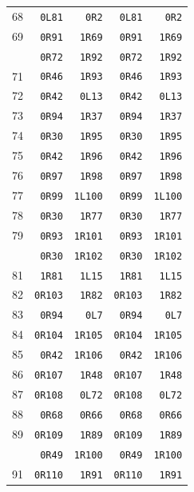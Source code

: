 \begin{longtable}{@{}r r r r r@{}}
68 & \texttt{0L81} & \texttt{0R2} & \texttt{0L81} & \texttt{0R2}\\
69 & \texttt{0R91} & \texttt{1R69} & \texttt{0R91} & \texttt{1R69}\\
\addlinespace[3pt]
70 & \texttt{0R72} & \texttt{1R92} & \texttt{0R72} & \texttt{1R92}\\
71 & \texttt{0R46} & \texttt{1R93} & \texttt{0R46} & \texttt{1R93}\\
72 & \texttt{0R42} & \texttt{0L13} & \texttt{0R42} & \texttt{0L13}\\
73 & \texttt{0R94} & \texttt{1R37} & \texttt{0R94} & \texttt{1R37}\\
74 & \texttt{0R30} & \texttt{1R95} & \texttt{0R30} & \texttt{1R95}\\
75 & \texttt{0R42} & \texttt{1R96} & \texttt{0R42} & \texttt{1R96}\\
76 & \texttt{0R97} & \texttt{1R98} & \texttt{0R97} & \texttt{1R98}\\
77 & \texttt{0R99} & \texttt{1L100} & \texttt{0R99} & \texttt{1L100}\\
78 & \texttt{0R30} & \texttt{1R77} & \texttt{0R30} & \texttt{1R77}\\
79 & \texttt{0R93} & \texttt{1R101} & \texttt{0R93} & \texttt{1R101}\\
\addlinespace[3pt]
80 & \texttt{0R30} & \texttt{1R102} & \texttt{0R30} & \texttt{1R102}\\
81 & \texttt{1R81} & \texttt{1L15} & \texttt{1R81} & \texttt{1L15}\\
82 & \texttt{0R103} & \texttt{1R82} & \texttt{0R103} & \texttt{1R82}\\
83 & \texttt{0R94} & \texttt{0L7} & \texttt{0R94} & \texttt{0L7}\\
84 & \texttt{0R104} & \texttt{1R105} & \texttt{0R104} & \texttt{1R105}\\
85 & \texttt{0R42} & \texttt{1R106} & \texttt{0R42} & \texttt{1R106}\\
86 & \texttt{0R107} & \texttt{1R48} & \texttt{0R107} & \texttt{1R48}\\
87 & \texttt{0R108} & \texttt{0L72} & \texttt{0R108} & \texttt{0L72}\\
88 & \texttt{0R68} & \texttt{0R66} & \texttt{0R68} & \texttt{0R66}\\
89 & \texttt{0R109} & \texttt{1R89} & \texttt{0R109} & \texttt{1R89}\\
\addlinespace[3pt]
90 & \texttt{0R49} & \texttt{1R100} & \texttt{0R49} & \texttt{1R100}\\
91 & \texttt{0R110} & \texttt{1R91} & \texttt{0R110} & \texttt{1R91}\\

\end{longtable}
